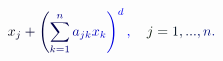 \documentclass[12pt]{article}
\begin{document}
\makeatletter
\renewcommand*{\@textcolor}[3]{%
  \protect\leavevmode
  \begingroup
    \color#1{#2}#3%
  \endgroup
}
\makeatother
\begin{displaymath}
\mathcolor[RGB]{0,0,15}{x} _ { \mathcolor[RGB]{0,0,30}{j} } \mathcolor[RGB]{0,0,45}{+} \mathcolor[RGB]{0,0,60}{\left(} \mathcolor[RGB]{0,0,75}{\sum} _ { \mathcolor[RGB]{0,0,90}{k} \mathcolor[RGB]{0,0,105}{=} \mathcolor[RGB]{0,0,120}{1} } ^ { \mathcolor[RGB]{0,0,135}{n} } \mathcolor[RGB]{0,0,150}{a} _ { \mathcolor[RGB]{0,0,165}{j} \mathcolor[RGB]{0,0,180}{k} } \mathcolor[RGB]{0,0,195}{x} _ { \mathcolor[RGB]{0,0,210}{k} } \mathcolor[RGB]{0,0,225}{\right)} ^ { \mathcolor[RGB]{0,0,240}{d} } \mathcolor[RGB]{0,0,255}{,} \quad \mathcolor[RGB]{0,15,0}{j} \mathcolor[RGB]{0,15,15}{=} \mathcolor[RGB]{0,15,30}{1} \mathcolor[RGB]{0,15,45}{,} \mathcolor[RGB]{0,15,60}{.} \mathcolor[RGB]{0,15,75}{.} \mathcolor[RGB]{0,15,90}{.} \mathcolor[RGB]{0,15,105}{,} \mathcolor[RGB]{0,15,120}{n} \mathcolor[RGB]{0,15,135}{.}
\end{displaymath}
\end{document}
